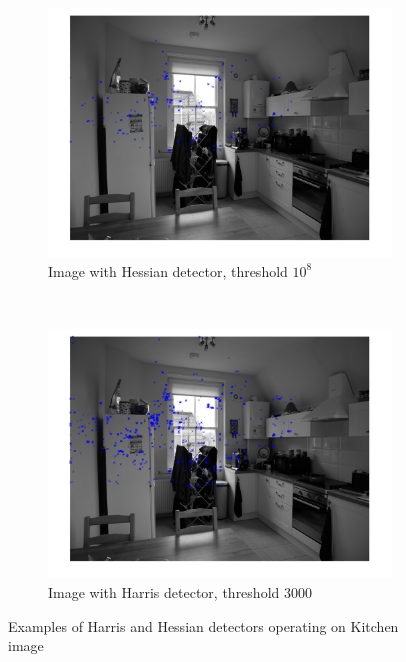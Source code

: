 \documentclass[a4paper, 10pt, conference]{ieeeconf}
\begin{document}
\begin{figure}[!ht]
  \captionsetup[subfigure]{position=b}
  \centering
    \begin{subfigure}{0.45\linewidth}
      \includegraphics[width=\textwidth]{pic/hessian1e8}
      \caption{Image with Hessian detector, threshold $10^8$}
      \label{fig:hessian1e8}
    \end{subfigure}
    ~
    \begin{subfigure}{0.45\linewidth}
      \includegraphics[width=\textwidth]{pic/harris3000}
      \caption{Image with Harris detector, threshold 3000}
      \label{fig:harris3000}
    \end{subfigure}

	\caption{Examples of Harris and Hessian detectors operating on Kitchen image}
    \vspace{-0.5cm}

  \label{fig:detectors}
\end{figure}
\end{document}
